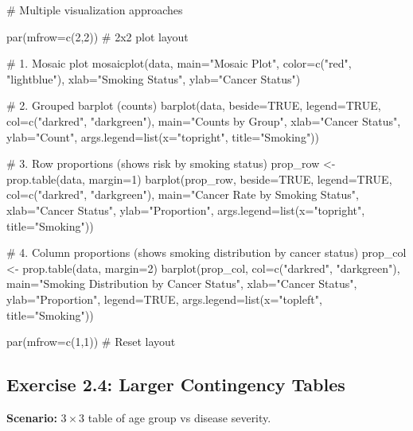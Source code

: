 \documentclass[11pt]{article}
\begin{document}
\begin{rcode}
# Multiple visualization approaches

par(mfrow=c(2,2))  # 2x2 plot layout

# 1. Mosaic plot
mosaicplot(data, main="Mosaic Plot",
           color=c("red", "lightblue"),
           xlab="Smoking Status", ylab="Cancer Status")

# 2. Grouped barplot (counts)
barplot(data, beside=TRUE, legend=TRUE,
        col=c("darkred", "darkgreen"),
        main="Counts by Group",
        xlab="Cancer Status", ylab="Count",
        args.legend=list(x="topright", title="Smoking"))

# 3. Row proportions (shows risk by smoking status)
prop_row <- prop.table(data, margin=1)
barplot(prop_row, beside=TRUE, legend=TRUE,
        col=c("darkred", "darkgreen"),
        main="Cancer Rate by Smoking Status",
        xlab="Cancer Status", ylab="Proportion",
        args.legend=list(x="topright", title="Smoking"))

# 4. Column proportions (shows smoking distribution by cancer status)
prop_col <- prop.table(data, margin=2)
barplot(prop_col, col=c("darkred", "darkgreen"),
        main="Smoking Distribution by Cancer Status",
        xlab="Cancer Status", ylab="Proportion",
        legend=TRUE,
        args.legend=list(x="topleft", title="Smoking"))

par(mfrow=c(1,1))  # Reset layout
\end{rcode}

\subsection{Exercise 2.4: Larger Contingency Tables}

\textbf{Scenario:} $3 \times 3$ table of age group vs disease severity.
\end{document}

